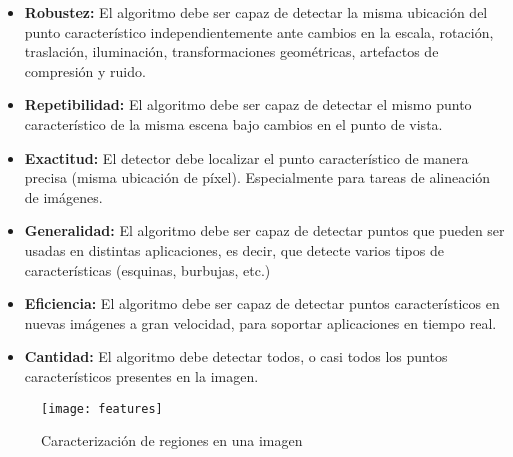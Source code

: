 \begin{itemize}
	\item \textbf{Robustez:} El algoritmo debe ser capaz de detectar la misma ubicación del punto característico independientemente ante cambios en la escala, rotación, traslación, iluminación, transformaciones geométricas, artefactos de compresión y ruido.
	
	\item \textbf{Repetibilidad:} El algoritmo debe ser capaz de detectar el mismo punto característico de la misma escena bajo cambios en el punto de vista.
	
	\item \textbf{Exactitud:} El detector debe localizar el punto característico de manera precisa (misma ubicación de píxel). Especialmente para tareas de alineación de imágenes.
	
	\item \textbf{Generalidad:} El algoritmo debe ser capaz de detectar puntos que pueden ser usadas en distintas aplicaciones, es decir, que detecte varios tipos de características (esquinas, burbujas, etc.)
	
	\item \textbf{Eficiencia:} El algoritmo debe ser capaz de detectar puntos característicos en nuevas imágenes a gran velocidad, para soportar aplicaciones en tiempo real.
	
	\item \textbf{Cantidad:} El algoritmo debe detectar todos, o casi todos los puntos característicos presentes en la imagen. 
	
\end{itemize}



\begin{figure}[H]
	\centering
	\texttt{[image: features]}
	\caption[Caracterización de regiones en una imagen]{Caracterización de regiones en una imagen\protect\footnotemark}
	\label{imagen:features}
\end{figure}

